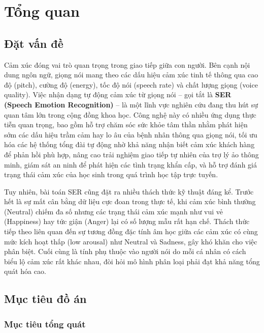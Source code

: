 \chapter{Tổng quan}
\label{chap:introduction}

\section{Đặt vấn đề}
\label{sec:problem}

Cảm xúc đóng vai trò quan trọng trong giao tiếp giữa con người. Bên cạnh nội dung ngôn ngữ, giọng nói mang theo các dấu hiệu cảm xúc tinh tế thông qua cao độ (pitch), cường độ (energy), tốc độ nói (speech rate) và chất lượng giọng (voice quality). Việc nhận dạng tự động cảm xúc từ giọng nói -- gọi tắt là \textbf{SER (Speech Emotion Recognition)} -- là một lĩnh vực nghiên cứu đang thu hút sự quan tâm lớn trong cộng đồng khoa học. Công nghệ này có nhiều ứng dụng thực tiễn quan trọng, bao gồm hỗ trợ chăm sóc sức khỏe tâm thần nhằm phát hiện sớm các dấu hiệu trầm cảm hay lo âu của bệnh nhân thông qua giọng nói, tối ưu hóa các hệ thống tổng đài tự động nhờ khả năng nhận biết cảm xúc khách hàng để phản hồi phù hợp, nâng cao trải nghiệm giao tiếp tự nhiên của trợ lý ảo thông minh, giám sát an ninh để phát hiện các tình trạng khẩn cấp, và hỗ trợ đánh giá trạng thái cảm xúc của học sinh trong quá trình học tập trực tuyến.

Tuy nhiên, bài toán SER cũng đặt ra nhiều thách thức kỹ thuật đáng kể. Trước hết là sự mất cân bằng dữ liệu cực đoan trong thực tế, khi cảm xúc bình thường (Neutral) chiếm đa số nhưng các trạng thái cảm xúc mạnh như vui vẻ (Happiness) hay tức giận (Anger) lại có số lượng mẫu rất hạn chế. Thách thức tiếp theo liên quan đến sự tương đồng đặc tính âm học giữa các cảm xúc có cùng mức kích hoạt thấp (low arousal) như Neutral và Sadness, gây khó khăn cho việc phân biệt. Cuối cùng là tính phụ thuộc vào người nói do mỗi cá nhân có cách biểu lộ cảm xúc rất khác nhau, đòi hỏi mô hình phân loại phải đạt khả năng tổng quát hóa cao.

\section{Mục tiêu đồ án}
\label{sec:objectives}

\subsection{Mục tiêu tổng quát}

